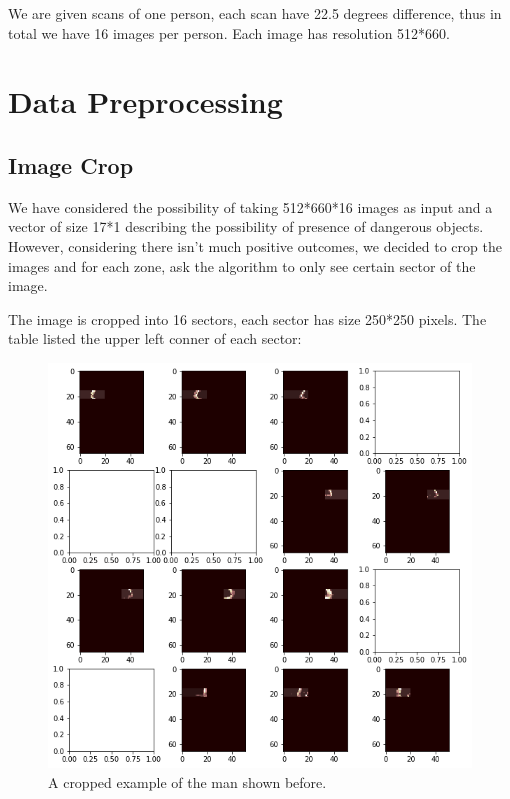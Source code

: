 \documentclass[conference,compsoc]{IEEEtran}
\begin{document}
	\par We are given scans of one person, each scan have 22.5 degrees difference, thus in total we have 16 images per person. Each image has resolution 512*660. 
	
\section{Data Preprocessing}
	\subsection{Image Crop}
		\par We have considered the possibility of taking 512*660*16 images as input and a vector of size 17*1 describing the possibility of presence of dangerous objects. However, considering there isn't much positive outcomes, we decided to crop the images and for each zone, ask the algorithm to only see certain sector of the image.
		\par The image is cropped into 16 sectors, each sector has size 250*250 pixels. The table listed the upper left conner of each sector:
		\begin{figure}[h] \label{cropped}
			\centering
			\includegraphics[width=0.9\linewidth]{../Pic/cropped}
			\caption{A cropped example of the man shown before.}
		\end{figure}
\end{document}
